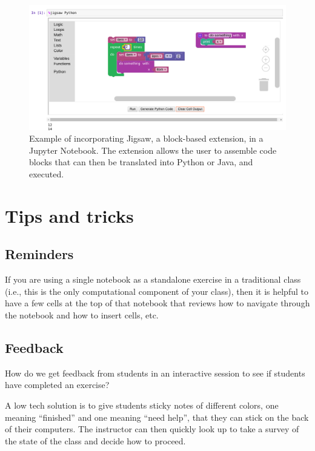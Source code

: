 \documentclass[]{book}
\begin{document}
\begin{figure}
\centering
\includegraphics{images/jigsaw.png}
\caption{Example of incorporating Jigsaw, a block-based extension, in a
Jupyter Notebook. The extension allows the user to assemble code blocks
that can then be translated into Python or Java, and executed.}
\end{figure}

\section{Tips and tricks}\label{tips-and-tricks}

\subsection{Reminders}\label{reminders}

If you are using a single notebook as a standalone exercise in a
traditional class (i.e., this is the only computational component of
your class), then it is helpful to have a few cells at the top of that
notebook that reviews how to navigate through the notebook and how to
insert cells, etc.

\subsection{Feedback}\label{feedback}

How do we get feedback from students in an interactive session to see if
students have completed an exercise?

A low tech solution is to give students sticky notes of different
colors, one meaning ``finished'' and one meaning ``need help'', that
they can stick on the back of their computers. The instructor can then
quickly look up to take a survey of the state of the class and decide
how to proceed.
\end{document}
